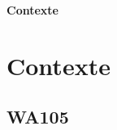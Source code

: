 




    {
        \begin{specialframe}
            \vspace{2cm}\hspace*{-1.8cm}\parbox[t]{\textwidth}{\titlepage}
        \end{specialframe}
    }
    \begin{specialframe}\tableofcontents\end{specialframe}

  \setcounter{framenumber}{0}
    {
        \begin{specialframe}
            \vspace{2cm}\hspace*{-1.8cm}\parbox[t]{\textwidth}{
                \begin{center}
                    \begin{Huge}
                            \textcolor{pheniics_purple}{\textbf{Contexte}}
                    \end{Huge}
                \end{center}
            }
        \end{specialframe}
    }

  \section{Contexte}
    \subsection{WA105}

